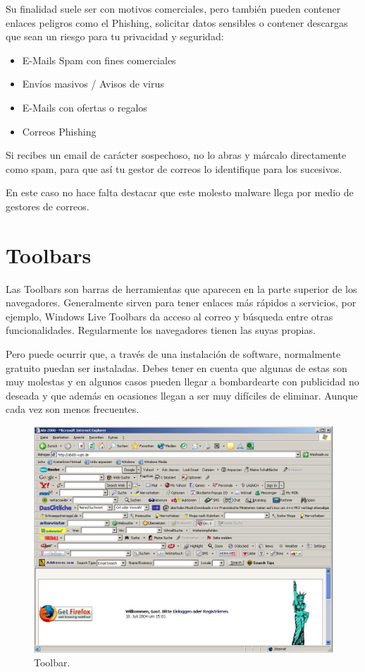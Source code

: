 \documentclass[
  a4paper,
  openany]{book}
\begin{document}
Su finalidad suele ser con motivos comerciales, pero también pueden contener enlaces peligros como el Phishing, solicitar datos sensibles o contener descargas que sean un riesgo para tu privacidad y seguridad:

\begin{itemize}
\item
  E-Mails Spam con fines comerciales
\item
  Envíos masivos / Avisos de virus
\item
  E-Mails con ofertas o regalos
\item
  Correos Phishing
\end{itemize}

Si recibes un email de carácter sospechoso, no lo abras y márcalo directamente como spam, para que así tu gestor de correos lo identifique para los sucesivos.

En este caso no hace falta destacar que este molesto malware llega por medio de gestores de correos.

\hypertarget{toolbars}{%
\section{Toolbars}\label{toolbars}}

Las Toolbars son barras de herramientas que aparecen en la parte superior de los navegadores. Generalmente sirven para tener enlaces más rápidos a servicios, por ejemplo, Windows Live Toolbars da acceso al correo y búsqueda entre otras funcionalidades. Regularmente los navegadores tienen las suyas propias.

Pero puede ocurrir que, a través de una instalación de software, normalmente gratuito puedan ser instaladas. Debes tener en cuenta que algunas de estas son muy molestas y en algunos casos pueden llegar a bombardearte con publicidad no deseada y que además en ocasiones llegan a ser muy difíciles de eliminar. Aunque cada vez son menos frecuentes.

\begin{figure}

{\centering \includegraphics[width=0.75\linewidth]{images/toolbar} 

}

\caption{Toolbar.}\label{fig:unnamed-chunk-20}
\end{figure}
\end{document}
